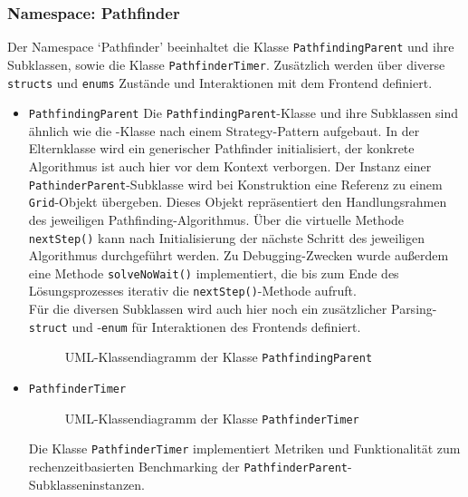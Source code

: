 \subsubsection{Namespace: Pathfinder}
\label{subsubsec:aufbau_backend_ueberblick_pathfinder}
Der Namespace `Pathfinder' beeinhaltet die Klasse \texttt{PathfindingParent} und ihre Subklassen, sowie die Klasse \texttt{PathfinderTimer}.
Zusätzlich werden über diverse \texttt{structs} und \texttt{enums} Zustände und Interaktionen mit dem Frontend definiert.
\begin{itemize}
    \item \texttt{PathfindingParent}
    Die \texttt{PathfindingParent}-Klasse und ihre Subklassen sind ähnlich wie die -Klasse nach einem Strategy-Pattern aufgebaut.
    In der Elternklasse wird ein generischer Pathfinder initialisiert, der konkrete Algorithmus ist auch hier vor dem Kontext verborgen.
    Der Instanz einer \texttt{PathinderParent}-Subklasse wird bei Konstruktion eine Referenz zu einem \texttt{Grid}-Objekt übergeben.
    Dieses Objekt repräsentiert den Handlungsrahmen des jeweiligen Pathfinding-Algorithmus.
    Über die virtuelle Methode \texttt{nextStep()} kann nach Initialisierung der nächste Schritt des jeweiligen Algorithmus durchgeführt werden.
    Zu Debugging-Zwecken wurde außerdem eine Methode \texttt{solveNoWait()} implementiert, die bis zum Ende des Lösungsprozesses
    iterativ die \texttt{nextStep()}-Methode aufruft.\\
    Für die diversen Subklassen wird auch hier noch ein zusätzlicher Parsing-\texttt{struct} und -\texttt{enum} für Interaktionen des Frontends definiert.
    \begin{figure}[H]
              \vspace{-0.5cm}
              \centering
              
              \caption{UML-Klassendiagramm der Klasse \texttt{PathfindingParent}}
              \label{fig:uml_pathfinder}
    \end{figure}
    \item \texttt{PathfinderTimer}
    \begin{figure}[H]
        \vspace{-0.5cm}
        \centering
        
        \caption{UML-Klassendiagramm der Klasse \texttt{PathfinderTimer}}
        \label{fig:uml_pathfinder_timer}
    \end{figure}
    Die Klasse \texttt{PathfinderTimer} implementiert Metriken und Funktionalität zum rechenzeitbasierten Benchmarking der \texttt{PathfinderParent}-Subklasseninstanzen.
\end{itemize}